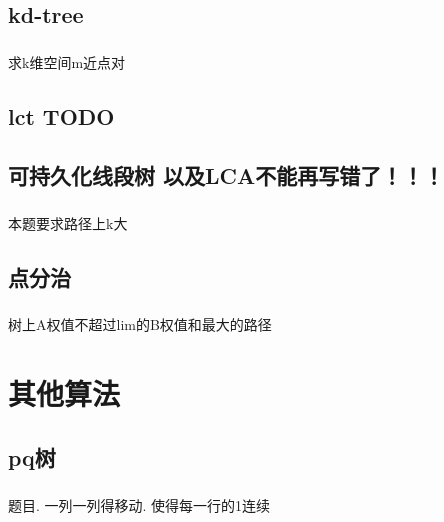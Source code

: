 \documentclass[landscape]{report}
\newcommand{\includecode}[2][c]{}
\begin{document}
\begin{flushleft}
\begin{multicols}{2}
\section{ kd-tree}
\paragraph{ }
求k维空间m近点对
\includecode[c++]{hdu4347.cpp} 
\section{lct TODO}
\includecode[c++]{hdu5398.cpp}
\section{可持久化线段树 以及LCA不能再写错了！！！}
\paragraph{ }
本题要求路径上k大
\includecode[c++]{COT.cpp}
\section{ 点分治}
\includecode[c++]{poj1741.cpp}
\paragraph{ }
树上A权值不超过lim的B权值和最大的路径
\includecode[c++]{poj1741.cpp}



\chapter{ 其他算法}
\section{pq树}
\paragraph{ }
	题目. 一列一列得移动. 使得每一行的1连续
	\includecode[c++]{cf243E.cpp}

\end{multicols}
\end{flushleft}
\end{document}
